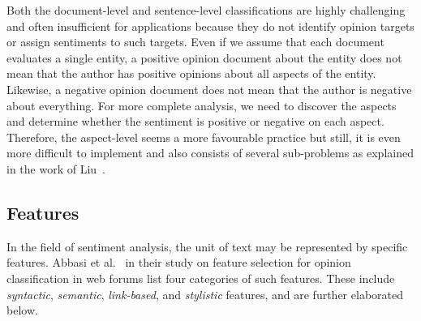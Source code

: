 Both the document-level and sentence-level classifications
are highly challenging and often insufficient for applications
because they do not identify opinion targets
or assign sentiments to such targets.
Even if we assume that each document evaluates a single entity,
a positive opinion document about the entity does not mean
that the author has positive opinions about all aspects of the entity.
Likewise, a negative opinion document does not mean
that the author is negative about everything.
For more complete analysis, we need to discover the aspects
and determine whether the sentiment is positive or negative on each aspect.
Therefore, the aspect-level seems a more favourable practice but still,
it is even more difficult to implement
and also consists of several sub-problems
as explained in the work of Liu~\cite{Liu12}.

\subsection{Features}
\label{subsec:features}

In the field of sentiment analysis,
the unit of text may be represented by specific features.
Abbasi et al.~\cite{ACS08} in their study on feature selection
for opinion classification in web forums
list four categories of such features.
These include \emph{syntactic}, \emph{semantic}, \emph{link-based},
and \emph{stylistic} features,
and are further elaborated below.


